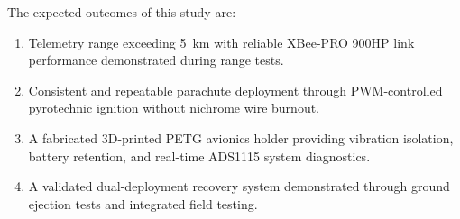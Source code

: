 The expected outcomes of this study are:
\begin{enumerate}
    \item Telemetry range exceeding 5~km with reliable XBee-PRO 900HP link performance demonstrated during range tests.
    \item Consistent and repeatable parachute deployment through PWM-controlled pyrotechnic ignition without nichrome wire burnout.
    \item A fabricated 3D-printed PETG avionics holder providing vibration isolation, battery retention, and real-time ADS1115 system diagnostics.
    \item A validated dual-deployment recovery system demonstrated through ground ejection tests and integrated field testing.
\end{enumerate}